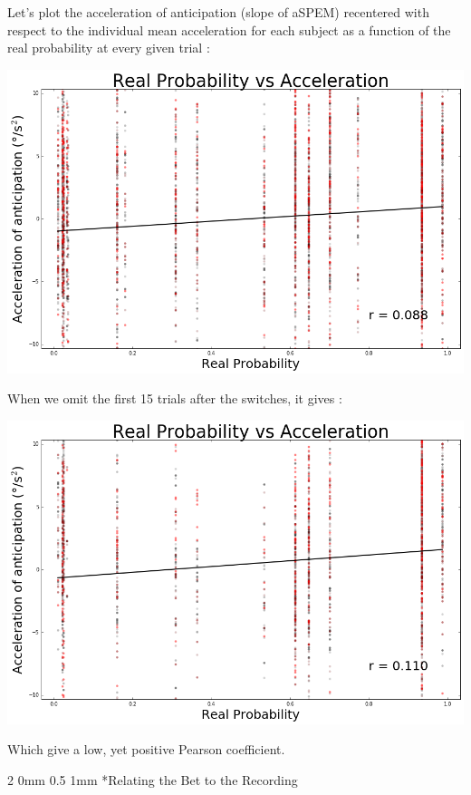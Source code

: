 \documentclass[profile,final,english, draft]{sciposter}%
\makeatletter
\renewcommand{\subsection}{\@startsection
        {subsection}%
        {2}%
        {0mm}%
        {0.5\baselineskip}%
        {1mm}%
        {\normalsize\color[rgb]{0.4,0,0}\bfseries}}%
\makeatother
\begin{document}
\begin{multicols}{3}
\columnbreak
Let's plot the acceleration of anticipation (slope of aSPEM) recentered with respect to the individual mean acceleration for each subject as a function of the real probability at every given trial :

\begin{center} 
    \includegraphics[width=1\columnwidth]{p_true--v_a_mean}
\end{center}

When we omit the first 15 trials after the switches, it gives :

\begin{center} 
    \includegraphics[width=1\columnwidth]{p_true--v_a_15_mean}
\end{center}

Which give a low, yet positive Pearson coefficient.

\subsection*{Relating the Bet to the Recording}


\end{multicols}
\end{document}
